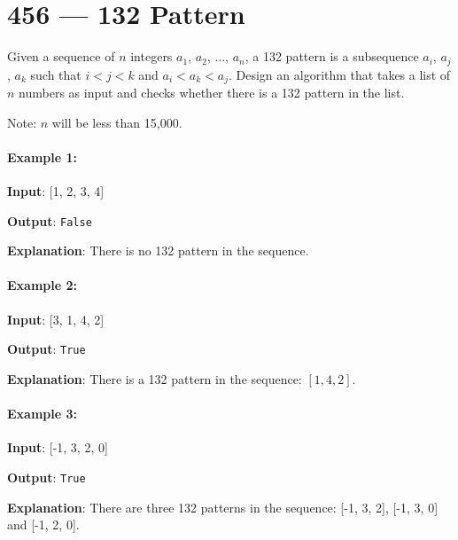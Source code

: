 \section{456 --- 132 Pattern}
Given a sequence of $n$ integers $a_1$, $a_2$, $\ldots$, $a_n$, a 132 pattern is a subsequence $a_i$, $a_j$, $a_k$ such that $i < j < k$ and $a_i < a_k < a_j$. Design an algorithm that takes a list of $n $ numbers as input and checks whether there is a 132 pattern in the list.

Note: $n$ will be less than 15,000.

\paragraph{Example 1:}

\begin{flushleft}
\textbf{Input}: [1, 2, 3, 4]

\textbf{Output}: \texttt{False}

\textbf{Explanation}: There is no 132 pattern in the sequence.
\end{flushleft}

\paragraph{Example 2:}

\begin{flushleft}
\textbf{Input}: [3, 1, 4, 2]

\textbf{Output}: \texttt{True}

\textbf{Explanation}: There is a 132 pattern in the sequence: $[1, 4, 2]$.
\end{flushleft}

\paragraph{Example 3:}

\begin{flushleft}
\textbf{Input}: [-1, 3, 2, 0]

\textbf{Output}: \texttt{True}

\textbf{Explanation}: There are three 132 patterns in the sequence: [-1, 3, 2], [-1, 3, 0] and [-1, 2, 0].

\end{flushleft}

